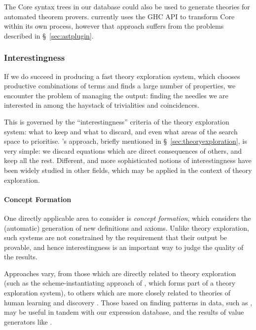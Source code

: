 The Core syntax trees in our database could also be used to generate theories
for automated theorem provers. \hipspec{} currently uses the GHC API to transform
Core within its own process, however that approach suffers from the problems
described in \S~\ref{sec:astplugin}.

\subsubsection{Interestingness}
\label{sec:interestingness}

If we do succeed in producing a fast theory exploration system, which chooses
productive combinations of terms and finds a large number of properties, we
encounter the problem of managing the output: finding the needles we are
interested in among the haystack of trivialities and coincidences.

This is governed by the ``interestingness'' criteria of the theory exploration
system: what to keep and what to discard, and even what areas of the search
space to prioritise. \quickspec{}'s approach, briefly mentioned in
\S~\ref{sec:theoryexploration}, is very simple: we discard equations which are
direct consequences of others, and keep all the rest. Different, and more
sophisticated notions of interestingness have been widely studied in other
fields, which may be applied in the context of theory exploration.

\paragraph{Concept Formation} \label{sec:conceptformation} \leavevmode \newline

One directly applicable area to consider is \emph{concept formation}, which
considers the (automatic) generation of new definitions and axioms. Unlike
theory exploration, such systems are not constrained by the requirement that
their output be provable, and hence interestingness is an important way to judge
the quality of the results.

Approaches vary, from those which are directly related to theory exploration
(such as the scheme-instantiating approach of
\cite{Montano-Rivas.McCasland.Dixon.ea:2012}, which forms part of a theory
exploration system), to others which are more closely related to theories of
human learning and discovery \cite{Piantadosi.Tenenbaum.Goodman:2012,
  mullerunderstanding}. Those based on finding patterns in data, such as
\cite{Wille:2005}, may be useful in tandem with our expression database, and
the results of value generators like \quickcheck{}.

